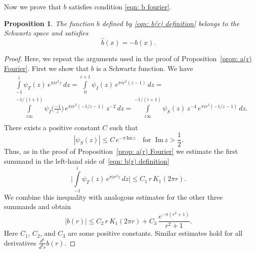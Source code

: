 \documentclass{scrartcl}
\renewcommand{\Im}{\mathrm{Im}\,}
\newtheorem{proposition}{Proposition}
\begin{document}
Now we prove that $b$ satisfies condition \eqref{eqn: b fourier}.
\begin{proposition}\label{prop: b(r) Fourier} The function $b$ defined by \eqref{eqn: b(r) definition} belongs to the Schwartz space and satisfies
  $$\widehat{b}(x)=-b(x). $$
\end{proposition}
\begin{proof}
Here, we repeat the arguments used in the proof of Proposition~\ref{prop: a(r) Fourier}. First we show that $b$ is a Schwartz function. We have
\begin{align*}
 &\int\limits_{-1}^{i}\psi_T(z)\,e^{\pi i r^2 z}\,dz=\int\limits_{0}^{i+1}\psi_I(z)\,e^{\pi i r^2 (z-1)}\,dz=\\
 &\int\limits_{i\infty}^{-1/(i+1)}\psi_I\Big(\frac{-1}{z}\Big)\,e^{\pi i r^2 (-1/z-1)}\,z^{-2}\,dz=\int\limits_{i\infty}^{-1/(i+1)}\psi_S(z)\,z^{-4}\,e^{\pi i r^2 (-1/z-1)}\,dz.\\
\end{align*}
There exists a positive constant $C$ such that
$$|\psi_S(z)|\leq C\,e^{-\pi\,\Im{z}}\quad\mbox{for }\;\Im{z}>\frac12.$$
Thus, as in the proof of Proposition~\ref{prop: a(r) Fourier} we estimate the first summand in the left-hand side of~\eqref{eqn: b(r) definition}
$$\Bigg|\int\limits_{-1}^i \psi_T(z)\,e^{\pi i r^2 z}\,dz \Bigg|\leq C_1\,r\,K_1(2\pi r).$$
We combine this inequality with analogous estimates for the other three summands and obtain
$$|b(r)|\leq C_2\,r\,K_1(2\pi r)+C_3\,\frac{e^{-\pi(r^2+1)}}{r^2+1}.$$
Here $C_1$, $C_2$, and $C_3$ are some positive constants. Similar estimates hold for all derivatives $\frac{d^k}{d^k r} b(r)$.


\end{proof}
\end{document}
